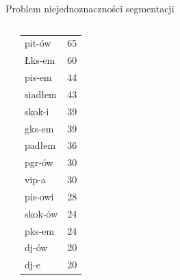 \documentclass[xcolor=dvipsnames,polish]{beamer}
\begin{document}
\begin{frame}{Problem niejednoznaczności segmentacji}
\begin{columns}[c]
\begin{center}
\begin{tabular}{l|r}
      \end{tabular}
    \end{center}
    \begin{center}
      \footnotesize
      \begin{tabular}{l|r}
        pit-ów & 65 \\
        Łks-em & 60 \\
        pis-em & 44 \\
        siadłem & 43 \\
        skok-i & 39 \\
        gks-em & 39 \\
        padłem & 36 \\
        pgr-ów & 30 \\
        vip-a & 30 \\
        pis-owi & 28 \\
        skok-ów & 24 \\
        pks-em & 24 \\
        dj-ów & 20 \\
        dj-e & 20 \\
      \end{tabular}
    \end{center}
  \end{columns}
\end{frame}
\end{document}
